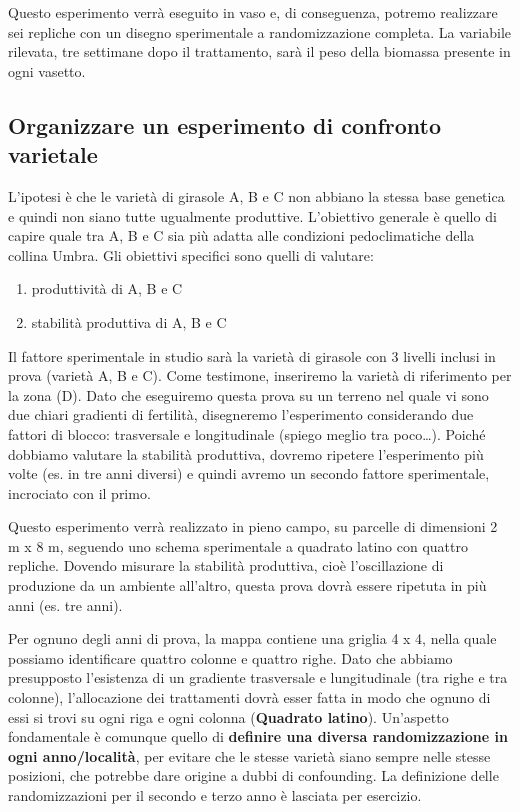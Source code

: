 \documentclass[a4paper,12pt,oneside]{book}
\providecommand{\tightlist}{%
  \setlength{\itemsep}{0pt}\setlength{\parskip}{0pt}}
\theoremstyle{definition}
\theoremstyle{definition}
\theoremstyle{definition}
\theoremstyle{remark}
\begin{document}
Questo esperimento verrà eseguito in vaso e, di conseguenza, potremo
realizzare sei repliche con un disegno sperimentale a randomizzazione
completa. La variabile rilevata, tre settimane dopo il trattamento, sarà
il peso della biomassa presente in ogni vasetto.

\subsection{Organizzare un esperimento di confronto
varietale}\label{organizzare-un-esperimento-di-confronto-varietale}

L'ipotesi è che le varietà di girasole A, B e C non abbiano la stessa
base genetica e quindi non siano tutte ugualmente produttive.
L'obiettivo generale è quello di capire quale tra A, B e C sia più
adatta alle condizioni pedoclimatiche della collina Umbra. Gli obiettivi
specifici sono quelli di valutare:

\begin{enumerate}
\def\labelenumi{\arabic{enumi}.}
\tightlist
\item
  produttività di A, B e C
\item
  stabilità produttiva di A, B e C
\end{enumerate}

Il fattore sperimentale in studio sarà la varietà di girasole con 3
livelli inclusi in prova (varietà A, B e C). Come testimone, inseriremo
la varietà di riferimento per la zona (D). Dato che eseguiremo questa
prova su un terreno nel quale vi sono due chiari gradienti di fertilità,
disegneremo l'esperimento considerando due fattori di blocco:
trasversale e longitudinale (spiego meglio tra poco\ldots{}). Poiché
dobbiamo valutare la stabilità produttiva, dovremo ripetere
l'esperimento più volte (es. in tre anni diversi) e quindi avremo un
secondo fattore sperimentale, incrociato con il primo.

Questo esperimento verrà realizzato in pieno campo, su parcelle di
dimensioni 2 m x 8 m, seguendo uno schema sperimentale a quadrato latino
con quattro repliche. Dovendo misurare la stabilità produttiva, cioè
l'oscillazione di produzione da un ambiente all'altro, questa prova
dovrà essere ripetuta in più anni (es. tre anni).

Per ognuno degli anni di prova, la mappa contiene una griglia 4 x 4,
nella quale possiamo identificare quattro colonne e quattro righe. Dato
che abbiamo presupposto l'esistenza di un gradiente trasversale e
lungitudinale (tra righe e tra colonne), l'allocazione dei trattamenti
dovrà esser fatta in modo che ognuno di essi si trovi su ogni riga e
ogni colonna (\textbf{Quadrato latino}). Un'aspetto fondamentale è
comunque quello di \textbf{definire una diversa randomizzazione in ogni
anno/località}, per evitare che le stesse varietà siano sempre nelle
stesse posizioni, che potrebbe dare origine a dubbi di confounding. La
definizione delle randomizzazioni per il secondo e terzo anno è lasciata
per esercizio.
\end{document}
